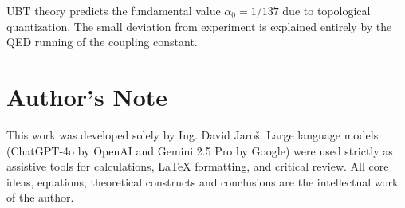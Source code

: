 \documentclass[12pt, a4paper]{article}
\begin{document}
UBT theory predicts the fundamental value \( \alpha_0 = 1/137 \) due to topological quantization. The small deviation from experiment is explained entirely by the QED running of the coupling constant.


\section*{Author's Note}

This work was developed solely by Ing. David Jaroš.  
Large language models (ChatGPT-4o by OpenAI and Gemini 2.5 Pro by Google) were used strictly as assistive tools for calculations, LaTeX formatting, and critical review.  
All core ideas, equations, theoretical constructs and conclusions are the intellectual work of the author.
\end{document}
